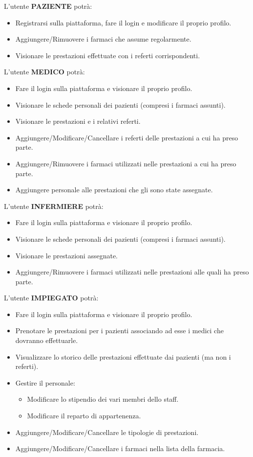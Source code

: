 \documentclass[paper=a4, fontsize=11pt,x11names]{report}
\begin{document}
L'utente \textbf{PAZIENTE} potrà:
\begin{itemize}
\item Registrarsi sulla piattaforma, fare il login e modificare il proprio profilo.
\item Aggiungere/Rimuovere i farmaci che assume regolarmente.
\item Visionare le prestazioni effettuate con i referti corrispondenti.
\end{itemize}

L'utente \textbf{MEDICO} potrà:
\begin{itemize}
\item Fare il login sulla piattaforma e visionare il proprio profilo.
\item Visionare le schede personali dei pazienti (compresi i farmaci assunti).
\item Visionare le prestazioni e i relativi referti.
\item Aggiungere/Modificare/Cancellare i referti delle prestazioni a cui ha preso parte.
\item Aggiungere/Rimuovere i farmaci utilizzati nelle prestazioni a cui ha preso parte.
\item Aggiungere personale alle prestazioni che gli sono state assegnate.
\end{itemize}

L'utente \textbf{INFERMIERE} potrà:
\begin{itemize}
\item Fare il login sulla piattaforma e visionare il proprio profilo.
\item Visionare le schede personali dei pazienti (compresi i farmaci assunti).
\item Visionare le prestazioni assegnate.
\item Aggiungere/Rimuovere i farmaci utilizzati nelle prestazioni alle quali ha preso parte.
\end{itemize}

L'utente \textbf{IMPIEGATO} potrà:
\begin{itemize}
\item Fare il login sulla piattaforma e visionare il proprio profilo.
\item Prenotare le prestazioni per i pazienti associando ad esse i medici che dovranno effettuarle.
\item Visualizzare lo storico delle prestazioni effettuate dai pazienti (ma non i referti). 
\item Gestire il personale:
	\begin{itemize}
		\item Modificare lo stipendio dei vari membri dello staff.
		\item Modificare il reparto di appartenenza.
	\end{itemize}
	
\item Aggiungere/Modificare/Cancellare le tipologie di prestazioni. 
\item Aggiungere/Modificare/Cancellare i farmaci nella lista della farmacia.
\end{itemize}
\end{document}
